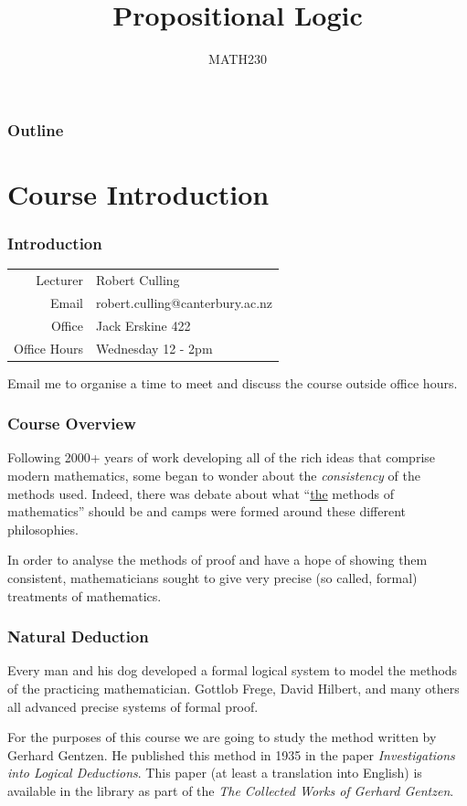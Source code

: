 \documentclass{beamer}
\title{Propositional Logic}
\author{MATH230}
\institute{Te Kura P\=angarau \\ Te Whare W\=ananga o Waitaha}
\date{}
\begin{document}
\begin{frame}

  \titlepage

\end{frame}

\begin{frame}
  \frametitle{Outline}

  \tableofcontents

\end{frame}

\section{Course Introduction}


\begin{frame}
	\frametitle{Introduction}

	\begin{tabular}{r l}
		Lecturer & Robert Culling \\
		Email & robert.culling@canterbury.ac.nz \\
		Office & Jack Erskine 422 \\
		Office Hours & Wednesday 12 - 2pm
	\end{tabular}

	Email me to organise a time to meet and discuss the course outside office hours. 
	

\end{frame}

\begin{frame}
	\frametitle{Course Overview}

	Following 2000+ years of work developing all of the rich ideas that comprise modern mathematics, some began to wonder about the \emph{consistency} of the methods used. Indeed, there was debate about what ``\underline{the} methods of mathematics'' should be and camps were formed around these different philosophies. 

	\vspace{5mm}

	In order to analyse the methods of proof and have a hope of showing them consistent, mathematicians sought to give very precise (so called, formal) treatments of mathematics. 

\end{frame}

\begin{frame}
	\frametitle{Natural Deduction}

	Every man and his dog developed a formal logical system to model the methods of the practicing mathematician. Gottlob Frege, David Hilbert, and many others all advanced precise systems of formal proof. 

	\vspace{5mm}

	For the purposes of this course we are going to study the method written by Gerhard Gentzen. He published this method in 1935 in the paper \emph{Investigations into Logical Deductions}. This paper (at least a translation into English) is available in the library as part of the \emph{The Collected Works of Gerhard Gentzen}.
\end{frame}
\end{document}
